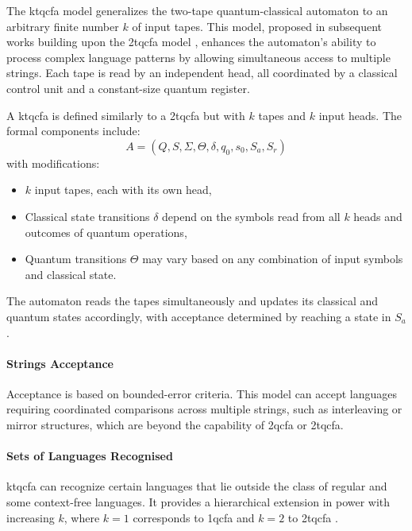   
The \gls{ktqcfa} model generalizes the two-tape quantum-classical automaton to an arbitrary finite number $k$ of input tapes. This model, proposed in subsequent works building upon the \gls{2tqcfa} model \cite{zheng2011two}, enhances the automaton's ability to process complex language patterns by allowing simultaneous access to multiple strings. Each tape is read by an independent head, all coordinated by a classical control unit and a constant-size quantum register.

\begin{definition}
A \gls{ktqcfa} is defined similarly to a \gls{2tqcfa} but with $k$ tapes and $k$ input heads. The formal components include:
\[
A = (Q, S, \Sigma, \Theta, \delta, q_0, s_0, S_a, S_r)
\]
with modifications:
\begin{itemize}
    \item $k$ input tapes, each with its own head,
    \item Classical state transitions $\delta$ depend on the symbols read from all $k$ heads and outcomes of quantum operations,
    \item Quantum transitions $\Theta$ may vary based on any combination of input symbols and classical state.
\end{itemize}
\end{definition}

The automaton reads the tapes simultaneously and updates its classical and quantum states accordingly, with acceptance determined by reaching a state in $S_a$.

\paragraph{Strings Acceptance}  
Acceptance is based on bounded-error criteria. This model can accept languages requiring coordinated comparisons across multiple strings, such as interleaving or mirror structures, which are beyond the capability of \gls{2qcfa} or \gls{2tqcfa}.

\paragraph{Sets of Languages Recognised}  
\gls{ktqcfa} can recognize certain languages that lie outside the class of regular and some context-free languages. It provides a hierarchical extension in power with increasing $k$, where $k=1$ corresponds to \gls{1qcfa} and $k=2$ to \gls{2tqcfa} \cite{li2015hybrid}.

